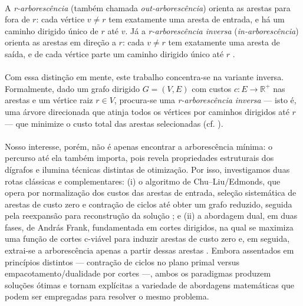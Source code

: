 \documentclass[12pt,a4paper]{article}
\begin{document}
\paragraph{}
A \textit{r-arborescência} (também chamada \textit{out-arborescência}) orienta as arestas para fora de \(r\): cada vértice \(v\neq r\) tem exatamente uma aresta de entrada, e há um caminho dirigido único de \(r\) até \(v\). Já a \textit{r-arborescência inversa} (\textit{in-arborescência}) orienta as arestas em direção a \(r\): cada \(v\neq r\) tem exatamente uma aresta de saída, e de cada vértice parte um caminho dirigido único até \(r\) \cite{edmonds1967optimum,frank2014}.

\paragraph{}
Com essa distinção em mente, este trabalho concentra-se na variante inversa. Formalmente, dado um grafo dirigido \(G=(V,E)\) com custos \(c:E\to\mathbb{R}^+\) nas arestas e um vértice raiz \(r\in V\), procura-se uma \textit{r-arborescência inversa} — isto é, uma árvore direcionada que atinja todos os vértices por caminhos dirigidos até \(r\) — que minimize o custo total das arestas selecionadas (cf. \cite{edmonds1967optimum,frank2014}).

\paragraph{}
Nosso interesse, porém, não é apenas encontrar a arborescência mínima: o percurso até ela também importa, pois revela propriedades estruturais dos dígrafos e ilumina técnicas distintas de otimização. Por isso, investigamos duas rotas clássicas e complementares: (i) o algoritmo de Chu--Liu/Edmonds, que opera por normalização dos custos das arestas de entrada, seleção sistemática de arestas de custo zero e contração de ciclos até obter um grafo reduzido, seguida pela reexpansão para reconstrução da solução \cite{chu1965,edmonds1967optimum}; e (ii) a abordagem dual, em duas fases, de András Frank, fundamentada em cortes dirigidos, na qual se maximiza uma função de cortes c-viável para induzir arestas de custo zero e, em seguida, extrai-se a arborescência apenas a partir dessas arestas \cite{frank2014}. Embora assentados em princípios distintos — contração de ciclos no plano primal versus empacotamento/dualidade por cortes —, ambos os paradigmas produzem soluções ótimas e tornam explícitas a variedade de abordagens matemáticas que podem ser empregadas para resolver o mesmo problema.
\end{document}
